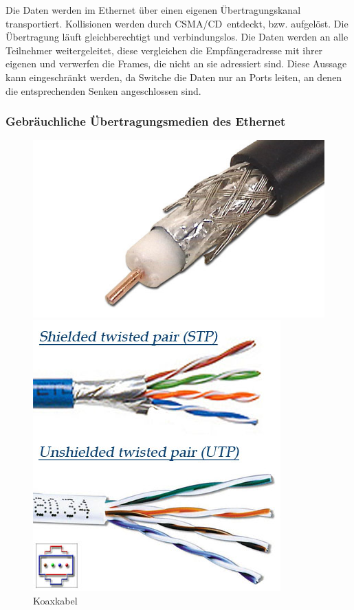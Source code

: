 \documentclass[12pt, a4paper, ngerman]{article}
\begin{document}
Die Daten werden im Ethernet über einen eigenen Übertragungskanal transportiert. Kollisionen werden durch \glqq CSMA/CD\grqq ~entdeckt, bzw. aufgelöst. Die Übertragung läuft gleichberechtigt und verbindungslos. Die Daten werden an alle Teilnehmer weitergeleitet, diese vergleichen die Empfängeradresse mit ihrer eigenen und verwerfen die Frames, die nicht an sie adressiert sind. Diese Aussage kann eingeschränkt werden, da Switche die Daten nur an Ports leiten, an denen die entsprechenden Senken angeschlossen sind. 

\subsubsection{Gebräuchliche Übertragungsmedien des Ethernet}
\begin{figure}[H]
\begin{minipage}[hbt]{.28\linewidth}
	\centering
	\includegraphics[width=0.9\linewidth]{Grafiken/koaxkabel.png}
	\caption{Koaxkabel \cite{koax_kabel}}
	\label{koaxkabel}
\end{minipage}
\hfill
\begin{minipage}[hbt]{.28\linewidth}
	\centering
	\includegraphics[width=0.9\linewidth]{Grafiken/twistetPair.jpg}

\end{minipage}
\end{figure}
\end{document}
